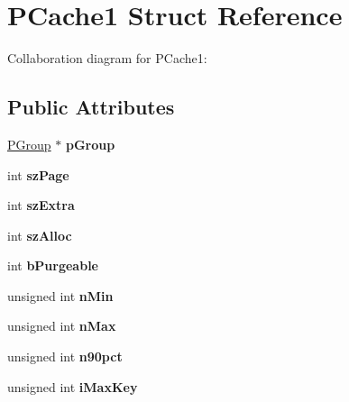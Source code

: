 \hypertarget{structPCache1}{}\section{P\+Cache1 Struct Reference}
\label{structPCache1}


Collaboration diagram for P\+Cache1\+:
\subsection*{Public Attributes}
\begin{DoxyCompactItemize}
\item 
\hyperlink{structPGroup}{P\+Group} $\ast$ {\bfseries p\+Group}\hypertarget{structPCache1_ae3389f0c68d6946a1eebeeee835ece69}{}\label{structPCache1_ae3389f0c68d6946a1eebeeee835ece69}

\item 
int {\bfseries sz\+Page}\hypertarget{structPCache1_a1425039a858b7518c097d8ae92597de0}{}\label{structPCache1_a1425039a858b7518c097d8ae92597de0}

\item 
int {\bfseries sz\+Extra}\hypertarget{structPCache1_a1e96e6671732e0af641732991b681ede}{}\label{structPCache1_a1e96e6671732e0af641732991b681ede}

\item 
int {\bfseries sz\+Alloc}\hypertarget{structPCache1_aa40b14da40f3c940978af20e99500000}{}\label{structPCache1_aa40b14da40f3c940978af20e99500000}

\item 
int {\bfseries b\+Purgeable}\hypertarget{structPCache1_a2af7d24e27369252addec9bef45afcfc}{}\label{structPCache1_a2af7d24e27369252addec9bef45afcfc}

\item 
unsigned int {\bfseries n\+Min}\hypertarget{structPCache1_a9e96c79ec60c2e368f92a2ba52d01c44}{}\label{structPCache1_a9e96c79ec60c2e368f92a2ba52d01c44}

\item 
unsigned int {\bfseries n\+Max}\hypertarget{structPCache1_aef08139a0b86b0c0a7ee2bec0bab2405}{}\label{structPCache1_aef08139a0b86b0c0a7ee2bec0bab2405}

\item 
unsigned int {\bfseries n90pct}\hypertarget{structPCache1_a8a5c5ab7d71e66c2a4df3f22513888f0}{}\label{structPCache1_a8a5c5ab7d71e66c2a4df3f22513888f0}

\item 
unsigned int {\bfseries i\+Max\+Key}\hypertarget{structPCache1_a2dff616ad2d1873ad3a8d20d53bcb4d0}{}\label{structPCache1_a2dff616ad2d1873ad3a8d20d53bcb4d0}


\end{DoxyCompactItemize}
